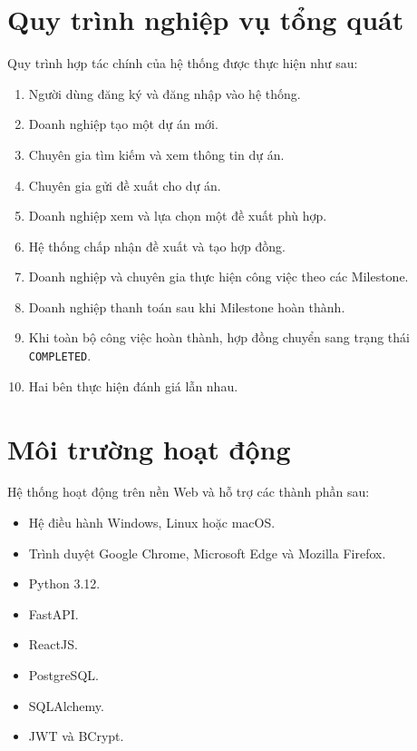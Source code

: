 
\section{Quy trình nghiệp vụ tổng quát}

Quy trình hợp tác chính của hệ thống được thực hiện như sau:

\begin{enumerate}
    \item Người dùng đăng ký và đăng nhập vào hệ thống.
    \item Doanh nghiệp tạo một dự án mới.
    \item Chuyên gia tìm kiếm và xem thông tin dự án.
    \item Chuyên gia gửi đề xuất cho dự án.
    \item Doanh nghiệp xem và lựa chọn một đề xuất phù hợp.
    \item Hệ thống chấp nhận đề xuất và tạo hợp đồng.
    \item Doanh nghiệp và chuyên gia thực hiện công việc theo các Milestone.
    \item Doanh nghiệp thanh toán sau khi Milestone hoàn thành.
    \item Khi toàn bộ công việc hoàn thành, hợp đồng chuyển sang trạng thái
    \texttt{COMPLETED}.
    \item Hai bên thực hiện đánh giá lẫn nhau.
\end{enumerate}


\section{Môi trường hoạt động}

Hệ thống hoạt động trên nền Web và hỗ trợ các thành phần sau:

\begin{itemize}
    \item Hệ điều hành Windows, Linux hoặc macOS.
    \item Trình duyệt Google Chrome, Microsoft Edge và Mozilla Firefox.
    \item Python 3.12.
    \item FastAPI.
    \item ReactJS.
    \item PostgreSQL.
    \item SQLAlchemy.
    \item JWT và BCrypt.
\end{itemize}

